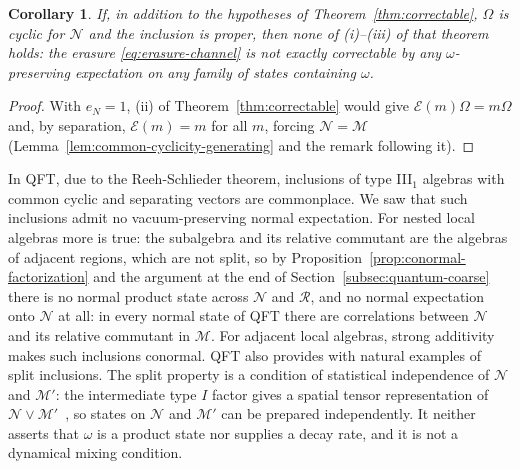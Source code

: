 \documentclass[a4paper,11pt]{article}
\newtheorem{corollary}[theorem]{Corollary}
\theoremstyle{definition}
\newcommand{\mE}{\mathcal{E}}
\begin{document}
\begin{corollary}\label{cor:common-cyclic-noncorrectable}
If, in addition to the hypotheses of Theorem~\ref{thm:correctable}, $\Omega$ is cyclic for $\mathcal N$ and the inclusion is proper, then none of {\rm(i)--(iii)} of that theorem holds: the erasure \eqref{eq:erasure-channel} is not exactly correctable by any $\omega$-preserving expectation on any family of states containing $\omega$.
\end{corollary}

\begin{proof}
With $e_N=1$, (ii) of Theorem~\ref{thm:correctable} would give $\mE(m)\Omega=m\Omega$ and, by separation, $\mE(m)=m$ for all $m$, forcing $\mathcal N=\mathcal M$ (Lemma~\ref{lem:common-cyclicity-generating} and the remark following it).
\end{proof}


In QFT, due to the Reeh-Schlieder theorem, inclusions of type III$_1$ algebras with common cyclic and separating vectors are commonplace. We saw that such inclusions admit no vacuum-preserving normal expectation. For nested local algebras more is true: the subalgebra and its relative commutant are the algebras of adjacent regions, which are not split, so by Proposition~\ref{prop:conormal-factorization} and the argument at the end of Section~\ref{subsec:quantum-coarse} there is no normal product state across $\mathcal N$ and $\mathcal R$, and no normal expectation onto $\mathcal N$ at all: in every normal state of QFT there are correlations between $\mathcal N$ and its relative commutant in $\mathcal M$. For adjacent local algebras, strong additivity makes such inclusions conormal. QFT also provides with natural examples of split inclusions. The split property is a condition of statistical independence of $\mathcal N$ and $\mathcal M'$: the intermediate type $I$ factor gives a spatial tensor representation of $\mathcal N\vee\mathcal M'$~\cite{standardinclusion}, so states on $\mathcal N$ and $\mathcal M'$ can be prepared independently. It neither asserts that $\omega$ is a product state nor supplies a decay rate, and it is not a dynamical mixing condition.
\end{document}
